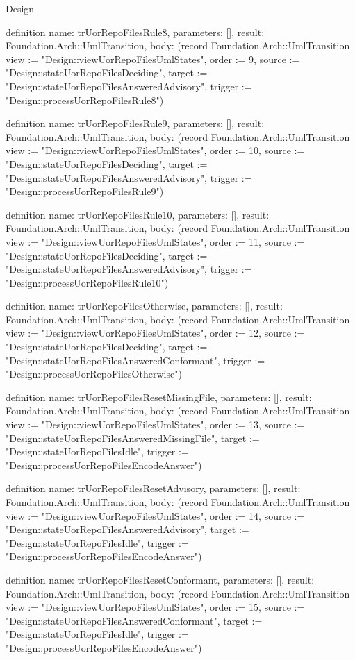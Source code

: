 \begin{lexlean}{Design}
\begin{semanticmodule}
definition{
  name: trUorRepoFilesRule8,
  parameters: [],
  result: Foundation.Arch::UmlTransition,
  body: (record Foundation.Arch::UmlTransition {view := "Design::viewUorRepoFilesUmlStates", order := 9, source := "Design::stateUorRepoFilesDeciding", target := "Design::stateUorRepoFilesAnsweredAdvisory", trigger := "Design::processUorRepoFilesRule8"})
}

definition{
  name: trUorRepoFilesRule9,
  parameters: [],
  result: Foundation.Arch::UmlTransition,
  body: (record Foundation.Arch::UmlTransition {view := "Design::viewUorRepoFilesUmlStates", order := 10, source := "Design::stateUorRepoFilesDeciding", target := "Design::stateUorRepoFilesAnsweredAdvisory", trigger := "Design::processUorRepoFilesRule9"})
}

definition{
  name: trUorRepoFilesRule10,
  parameters: [],
  result: Foundation.Arch::UmlTransition,
  body: (record Foundation.Arch::UmlTransition {view := "Design::viewUorRepoFilesUmlStates", order := 11, source := "Design::stateUorRepoFilesDeciding", target := "Design::stateUorRepoFilesAnsweredAdvisory", trigger := "Design::processUorRepoFilesRule10"})
}

definition{
  name: trUorRepoFilesOtherwise,
  parameters: [],
  result: Foundation.Arch::UmlTransition,
  body: (record Foundation.Arch::UmlTransition {view := "Design::viewUorRepoFilesUmlStates", order := 12, source := "Design::stateUorRepoFilesDeciding", target := "Design::stateUorRepoFilesAnsweredConformant", trigger := "Design::processUorRepoFilesOtherwise"})
}

definition{
  name: trUorRepoFilesResetMissingFile,
  parameters: [],
  result: Foundation.Arch::UmlTransition,
  body: (record Foundation.Arch::UmlTransition {view := "Design::viewUorRepoFilesUmlStates", order := 13, source := "Design::stateUorRepoFilesAnsweredMissingFile", target := "Design::stateUorRepoFilesIdle", trigger := "Design::processUorRepoFilesEncodeAnswer"})
}

definition{
  name: trUorRepoFilesResetAdvisory,
  parameters: [],
  result: Foundation.Arch::UmlTransition,
  body: (record Foundation.Arch::UmlTransition {view := "Design::viewUorRepoFilesUmlStates", order := 14, source := "Design::stateUorRepoFilesAnsweredAdvisory", target := "Design::stateUorRepoFilesIdle", trigger := "Design::processUorRepoFilesEncodeAnswer"})
}

definition{
  name: trUorRepoFilesResetConformant,
  parameters: [],
  result: Foundation.Arch::UmlTransition,
  body: (record Foundation.Arch::UmlTransition {view := "Design::viewUorRepoFilesUmlStates", order := 15, source := "Design::stateUorRepoFilesAnsweredConformant", target := "Design::stateUorRepoFilesIdle", trigger := "Design::processUorRepoFilesEncodeAnswer"})
}


\end{semanticmodule}
\end{lexlean}
